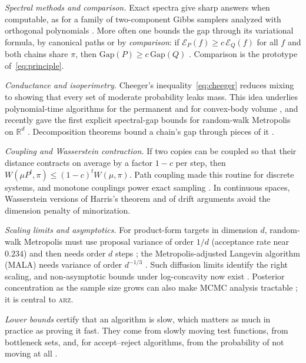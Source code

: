 \documentclass[11pt]{article}
\theoremstyle{remark}
\newcommand{\ARZ}{\textsc{arz}}
\newcommand{\Gap}{\mathrm{Gap}}
\begin{document}
\emph{Spectral methods and comparison.} Exact spectra give sharp answers when computable, as for a family of two-component Gibbs samplers analyzed with orthogonal polynomials \citep{diaconis2008gibbs}. More often one bounds the gap through its variational formula, by canonical paths \citep{diaconis1991geometric} or by \emph{comparison}: if $\mathcal E_P(f)\ge c\,\mathcal E_Q(f)$ for all $f$ and both chains share $\pi$, then $\Gap(P)\ge c\,\Gap(Q)$ \citep{diaconis1993comparison}. Comparison is the prototype of~\eqref{eq:principle}.

\emph{Conductance and isoperimetry.} Cheeger's inequality~\eqref{eq:cheeger} reduces mixing to showing that every set of moderate probability leaks mass. This idea underlies polynomial-time algorithms for the permanent \citep{sinclair1989,jerrum2004permanent} and for convex-body volume \citep{dyer1991volume,lovasz1993random}, and recently gave the first explicit spectral-gap bounds for random-walk Metropolis on $\mathbb R^d$ \citep{andrieu2024explicit}. Decomposition theorems bound a chain's gap through pieces of it \citep{madras2002}.

\emph{Coupling and Wasserstein contraction.} If two copies can be coupled so that their distance contracts on average by a factor $1-c$ per step, then $W(\mu P^t,\pi)\le(1-c)^tW(\mu,\pi)$. Path coupling \citep{bubley1997path} made this routine for discrete systems, and monotone couplings power exact sampling \citep{propp1996exact}. In continuous spaces, Wasserstein versions of Harris's theorem and of drift arguments \citep{hairer2011asymptotic,durmus2015quantitative,qin2022wasserstein} avoid the dimension penalty of minorization.

\emph{Scaling limits and asymptotics.} For product-form targets in dimension $d$, random-walk Metropolis must use proposal variance of order $1/d$ (acceptance rate near $0.234$) and then needs order $d$ steps \citep{roberts1997weak}; the Metropolis-adjusted Langevin algorithm (MALA) needs variance of order $d^{-1/3}$ \citep{roberts1998optimal}. Such diffusion limits identify the right scaling, and non-asymptotic bounds under log-concavity now exist \citep{dwivedi2019}. Posterior concentration as the sample size grows can also make MCMC analysis tractable \citep{belloni2009}; it is central to \ARZ.

\emph{Lower bounds} certify that an algorithm is slow, which matters as much in practice as proving it fast. They come from slowly moving test functions, from bottleneck sets, and, for accept--reject algorithms, from the probability of not moving at all \citep{brown2024lower}.
\end{document}
